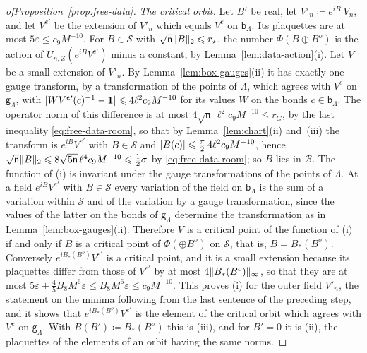 \documentclass[11pt]{preprint}
\makeatletter
\newcommand{\id}{\mathbf 1}
\DeclarePairedDelimiter{\abs}{\lvert}{\rvert}
\DeclarePairedDelimiter{\norm}{\lVert}{\rVert}
\newcommand*{\bigcdot}{}%
\DeclareRobustCommand*{\bigcdot}{%
	\mathbin{\mathpalette\bigcdot@{}}%
}
\newcommand*{\bigcdot@scalefactor}{.7}
\newcommand*{\bigcdot@widthfactor}{1.15}
\newcommand*{\bigcdot@}[2]{%
	\sbox0{$#1\vcenter{}$}%
	\sbox2{$#1\cdot\m@th$}%
	\hbox to \bigcdot@widthfactor\wd2{%
		\hss
		\raise\ht0\hbox{%
			\scalebox{\bigcdot@scalefactor}{%
				\lower\ht0\hbox{$#1\bullet\m@th$}%
			}%
		}%
		\hss
	}%
}
\numberwithin{equation}{section}
\makeatother
\begin{document}
\begin{proof}[ofProposition~\ref{prop:free-data}]
\emph{The critical orbit.} Let $B'$ be real, let $V'_n \coloneqq e^{iB'}V_n$, and let $V^{e\prime}$ be the extension of $V'_n$ which equals $V^e$ on $\mathsf b_\Lambda$. Its plaquettes are at most $5\varepsilon \leqslant c_9M^{-10}$. For $B \in \mathcal S$ with $\sqrt{\mathsf n}\norm B_2 \leqslant r_\star$, the number $\Phi(B \oplus B^o)$ is the action of $U_{n,Z}(e^{iB}V^{e\prime})$ minus a constant, by Lemma~\ref{lem:data-action}(i). Let $V$ be a small extension of $V'_n$. By Lemma~\ref{lem:box-gauges}(ii) it has exactly one gauge transform, by a transformation of the points of $\Lambda$, which agrees with $V^e$ on $\mathsf g_\Lambda$, with $\abs{WV^{e\prime}(c)^{-1} - \id} \leqslant 4\ell^2c_9M^{-10}$ for its values $W$ on the bonds $c \in \mathsf b_\Lambda$. The operator norm of this difference is at most $4\sqrt{\mathsf n}\,\ell^2c_9M^{-10} \leqslant r_G$, by the last inequality \eqref{eq:free-data-room}, so that by Lemma~\ref{lem:chart}(ii) and~(iii) the transform is $e^{iB}V^{e\prime}$ with $B \in \mathcal S$ and $\abs{B(c)} \leqslant \frac{\pi}{2}\,4\ell^2c_9M^{-10}$, hence $\sqrt{\mathsf n}\norm B_2 \leqslant 8\sqrt{5\mathsf n}\,\ell^4c_9M^{-10} \leqslant \frac{1}{2}\sigma$ by \eqref{eq:free-data-room}; so $B$ lies in $\mathcal B$. The function of (i) is invariant under the gauge transformations of the points of $\Lambda$. At a field $e^{iB}V^{e\prime}$ with $B \in \mathcal S$ every variation of the field on $\mathsf b_\Lambda$ is the sum of a variation within $\mathcal S$ and of the variation by a gauge transformation, since the values of the latter on the bonds of $\mathsf g_\Lambda$ determine the transformation as in Lemma~\ref{lem:box-gauges}(ii). Therefore $V$ is a critical point of the function of (i) if and only if $B$ is a critical point of $\Phi(\bigcdot \oplus B^o)$ on $\mathcal S$, that is, $B = B_*(B^o)$. Conversely $e^{iB_*(B^o)}V^{e\prime}$ is a critical point, and it is a small extension because its plaquettes differ from those of $V^{e\prime}$ by at most $4\norm{B_*(B^o)}_\infty$, so that they are at most $5\varepsilon + \frac{4}{5}B_8M^6\varepsilon \leqslant B_8M^6\varepsilon \leqslant c_9M^{-10}$. This proves (i) for the outer field $V'_n$, the statement on the minima following from the last sentence of the preceding step, and it shows that $e^{iB_*(B^o)}V^{e\prime}$ is the element of the critical orbit which agrees with $V^e$ on $\mathsf g_\Lambda$. With $B(B') \coloneqq B_*(B^o)$ this is (iii), and for $B' = 0$ it is (ii), the plaquettes of the elements of an orbit having the same norms.
\end{proof}
\end{document}
